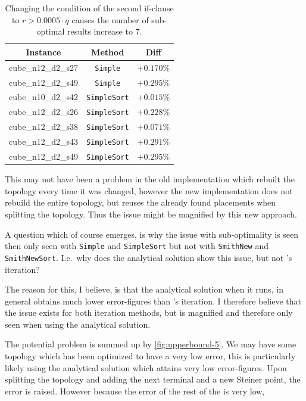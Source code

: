 \begin{table}[htbp]
  \centering
  \begin{tabular}{ccc}
    \toprule
    Instance           & Method              & Diff       \\
    \midrule
    cube\_n12\_d2\_s27 & \texttt{Simple}     & $+0.170\%$ \\
    cube\_n12\_d2\_s49 & \texttt{Simple}     & $+0.295\%$ \\
    cube\_n10\_d2\_s42 & \texttt{SimpleSort} & $+0.015\%$ \\
    cube\_n12\_d2\_s26 & \texttt{SimpleSort} & $+0.228\%$ \\
    cube\_n12\_d2\_s38 & \texttt{SimpleSort} & $+0.071\%$ \\
    cube\_n12\_d2\_s43 & \texttt{SimpleSort} & $+0.291\%$ \\
    cube\_n12\_d2\_s49 & \texttt{SimpleSort} & $+0.295\%$ \\
    \bottomrule
  \end{tabular}
  \caption[Sub-optimal results with condition $r > 0.0005 \cdot q$]{Changing
    the condition of the second if-clause to $r > 0.0005 \cdot q$ causes the
    number of sub-optimal results increase to $7$.\label{tab:correctness-errors-2}}
\end{table}

This may not have been a problem in the old implementation which rebuilt the
topology every time it was changed, however the new implementation does not
rebuild the entire topology, but reuses the already found placements when
splitting the topology. Thus the issue might be magnified by this new approach. 

A question which of course emerges, is why the issue with sub-optimality is seen
then only seen with \texttt{Simple} and \texttt{SimpleSort} but not with
\texttt{SmithNew} and \texttt{SmithNewSort}. I.e.\ why does the analytical
solution show this issue, but not \citeauthor{smith1992}'s iteration?

The reason for this, I believe, is that the analytical solution when it runs, in
general obtains much lower error-figures than \citeauthor{smith1992}'s
iteration. I therefore believe that the issue exists for both iteration methods,
but is magnified and therefore only seen when using the analytical solution.

The potential problem is summed up by \cref{fig:upperbound-5}. We may have some
topology which has been optimized to have a very low error, this is particularly
likely using the analytical solution which attains very low error-figures. Upon
splitting the topology and adding the next terminal and a new Steiner point, the
error is raised. However because the error of the rest of the is very low,  


